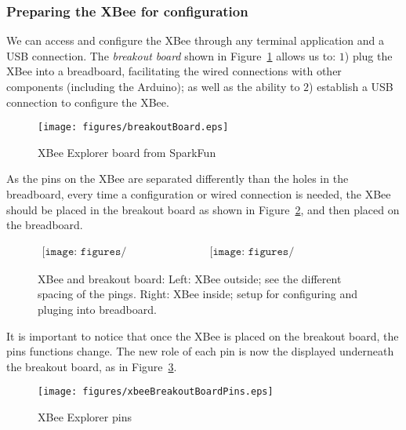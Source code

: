 \subsubsection{Preparing the XBee for configuration}

We can access and configure the XBee through any terminal application and a USB connection. The \emph{breakout board} shown in Figure~\ref{fig:breakoutBoard} allows us to: $1$) plug the XBee into a breadboard, facilitating the wired connections with other components (including the Arduino); as well as the ability to $2$) establish a USB connection to configure the XBee.

\begin{figure}[htbp]
  \centering
  \texttt{[image: figures/breakoutBoard.eps]}
  \caption{XBee Explorer board from SparkFun
  \label{fig:breakoutBoard}}
\end{figure}

As the pins on the XBee are separated differently than the holes in the breadboard, every time a configuration or wired connection is needed, the XBee should be placed in the breakout board as shown in Figure~\ref{fig:xbeeAndBreakoutBoard}, and then placed on the breadboard.

\begin{figure}[htbp]
  \begin{center}$
    \begin{array}{cc}
      \texttt{[image: figures/xbeeAndBreakoutBoard.eps]}\label{xbeeOutside} &
      \texttt{[image: figures/xbeeAndBreakoutBoard-inserted.eps]}\label{xbeeInside}
    \end{array}$
  \end{center}
  \caption{XBee and breakout board: Left: XBee outside; see the different spacing of the pings. Right: XBee inside; setup for configuring and pluging into breadboard.
    \label{fig:xbeeAndBreakoutBoard}}
\end{figure}

It is important to notice that once the XBee is placed on the breakout board, the pins functions change. The new role of each pin is now the displayed underneath the breakout board, as in Figure~\ref{fig:xbeeBreakoutBoardPins}.

\begin{figure}[htbp]
  \centering
  \texttt{[image: figures/xbeeBreakoutBoardPins.eps]}
  \caption{XBee Explorer pins
  \label{fig:xbeeBreakoutBoardPins}}
\end{figure}

